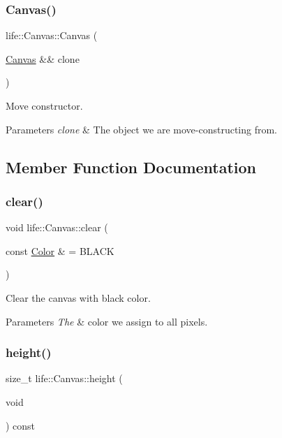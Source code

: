 \subsubsection{\texorpdfstring{Canvas()}{Canvas()}\hspace{0.1cm}{\footnotesize\ttfamily [3/3]}}
{\footnotesize\ttfamily life\+::\+Canvas\+::\+Canvas (\begin{DoxyParamCaption}\item[{\mbox{\hyperlink{classlife_1_1_canvas}{Canvas}} \&\&}]{clone }\end{DoxyParamCaption})}



Move constructor. 


\begin{DoxyParams}{Parameters}
{\em clone} & The object we are move-\/constructing from. \\
\hline
\end{DoxyParams}


\subsection{Member Function Documentation}
\mbox{\label{classlife_1_1_canvas_aa8efaeffbb347652940006e5b3e3cac2}} 
\subsubsection{\texorpdfstring{clear()}{clear()}}
{\footnotesize\ttfamily void life\+::\+Canvas\+::clear (\begin{DoxyParamCaption}\item[{const \mbox{\hyperlink{structlife_1_1_color}{Color}} \&}]{ = {\ttfamily BLACK} }\end{DoxyParamCaption})}



Clear the canvas with black color. 


\begin{DoxyParams}{Parameters}
{\em The} & color we assign to all pixels. \\
\hline
\end{DoxyParams}
\mbox{\label{classlife_1_1_canvas_ae404ca8fbd5162d3834571106a3edd95}} 
\subsubsection{\texorpdfstring{height()}{height()}}
{\footnotesize\ttfamily size\+\_\+t life\+::\+Canvas\+::height (\begin{DoxyParamCaption}\item[{void}]{ }\end{DoxyParamCaption}) const\hspace{0.3cm}{\ttfamily [inline]}}




